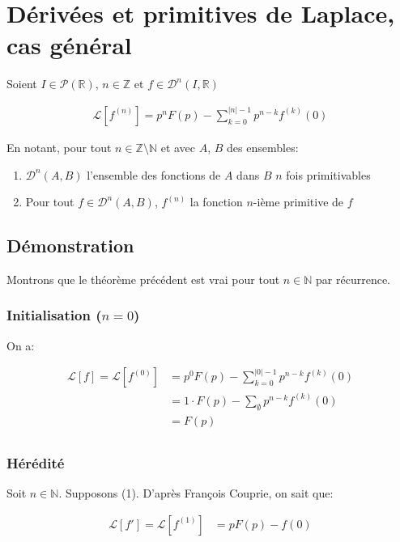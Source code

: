 \documentclass{article}
\newcommand{\R}{{\mathbb R}}
\newcommand{\N}{{\mathbb N}}
\newcommand{\Z}{{\mathbb Z}}
\begin{document}
\section*{Dérivées et primitives de Laplace, cas général}


Soient $I \in \mathcal P(\R)$, $n \in \Z$ et $f \in \mathcal D^{n}(I, \R)$

\begin{align}
	\mathcal L [ f^{(n)} ] = p^{n}F(p)-\sum_{k=0}^{|n|-1} p^{n-k} f^{(k)}(0)
\end{align}

En notant, pour tout $n \in \Z\setminus\N$ et avec $A$, $B$ des ensembles:

\begin{enumerate}
	\item $\mathcal D^{n}(A, B)$ l'ensemble des fonctions de $A$ dans $B$ $n$ fois primitivables
	\item Pour tout $f \in \mathcal D^{n}(A, B)$, $f^{(n)}$ la fonction $n$-ième primitive de $f$ 
\end{enumerate}


\subsection*{Démonstration}
Montrons que le théorème précédent est vrai pour tout $n \in \N$ par récurrence.

\subsubsection*{Initialisation ($n = 0$)}
On a: 

\begin{align*}
	\mathcal L[f] =\mathcal L[f^{(0)}] &= p^0 F(p) - \sum_{k=0}^{|0|-1} p^{n-k} f^{(k)}(0) \\
						&= 1 \cdot F(p) - \sum_{\emptyset}^{} p^{n-k} f^{(k)}(0) \\
						&= F(p) \\
\end{align*}

\subsubsection*{Hérédité}
Soit $n \in \N$. Supposons (1).
D'après François Couprie, on sait que:

\begin{align}
	\mathcal L[f'] = \mathcal L[f^{(1)}] &= pF(p) - f(0)
\end{align}
\end{document}
